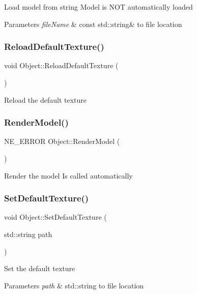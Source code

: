 Load model from string Model is N\+OT automatically loaded 
\begin{DoxyParams}{Parameters}
{\em file\+Name} & const std\+::string\& to file location \\
\hline
\end{DoxyParams}
\mbox{\label{class_object_a1704530eba80bb3693f68356f3e0462b}} 
\subsubsection{\texorpdfstring{ReloadDefaultTexture()}{ReloadDefaultTexture()}}
{\footnotesize\ttfamily void Object\+::\+Reload\+Default\+Texture (\begin{DoxyParamCaption}{ }\end{DoxyParamCaption})}

Reload the default texture \mbox{\label{class_object_a357d3469a47d0272bb03b84ff0b27255}} 
\subsubsection{\texorpdfstring{RenderModel()}{RenderModel()}}
{\footnotesize\ttfamily N\+E\+\_\+\+E\+R\+R\+OR Object\+::\+Render\+Model (\begin{DoxyParamCaption}{ }\end{DoxyParamCaption})}

Render the model Is called automatically \mbox{\label{class_object_a407d49a8187a96845be14ee529c78ab8}} 
\subsubsection{\texorpdfstring{SetDefaultTexture()}{SetDefaultTexture()}}
{\footnotesize\ttfamily void Object\+::\+Set\+Default\+Texture (\begin{DoxyParamCaption}\item[{std\+::string}]{path }\end{DoxyParamCaption})}

Set the default texture 
\begin{DoxyParams}{Parameters}
{\em path} & std\+::string to file location \\
\hline
\end{DoxyParams}
\mbox{\label{class_object_a7720d633ad5c4460867719b97851b11b}} 
